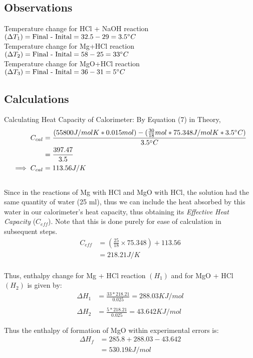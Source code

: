\cleardoublepage
\subsection{Observations}
Temperature change for HCl + NaOH reaction $(\Delta T_1) = \text{Final - Inital} = 32.5 - 29 = 3.5\degree C$ \\
Temperature change for Mg+HCl reaction $(\Delta T_2) = \text{Final - Inital} = 58 - 25 = 33\degree C$ \\
Temperature change for MgO+HCl reaction $(\Delta T_3) = \text{Final - Inital} = 36 - 31 = 5\degree C$ \\

\subsection{Calculations}
Calculating Heat Capacity of Calorimeter:
By Equation (7) in Theory,
\begin{align*}
  C_{cal}&=\frac{(55800J/molK * 0.015 mol) - (\frac{30}{18} mol * 75.348J/mol K * 3.5\degree C)}{3.5\degree C} \\
  &= \frac{397.47}{3.5} \\
    \implies C_{cal}&=113.56 J/K
\end{align*}
\\
Since in the reactions of Mg with HCl and MgO with HCl, the solution had the same quantity of water (25 ml), thus we can include the heat absorbed by this water in our calorimeter's heat capacity, thus obtaining its \emph{Effective Heat Capacity} ($C_{eff}$). Note that this is done purely for ease of calculation in subsequent steps.
\begin{align*}
  C_{eff} &= (\frac{25}{18} \times 75.348) + 113.56 \\
  &=218.21 J/K \\
\end{align*}

Thus, enthalpy change for Mg + HCl reaction $(H_1)$ and for MgO + HCl $(H_2)$ is given by:
\begin{align*}
  \Delta H_1 &= \frac{33*218.21}{0.025} = 288.03 KJ/mol \\ \\
  \Delta H_2 &= \frac{5*218.21}{0.025} = 43.642 KJ/mol
\end{align*}

Thus the enthalpy of formation of MgO within experimental errors is:
\begin{align*}
  \Delta H_f &= 285.8 + 288.03 - 43.642 \\
&= 530.19 kJ/mol
\end{align*}

